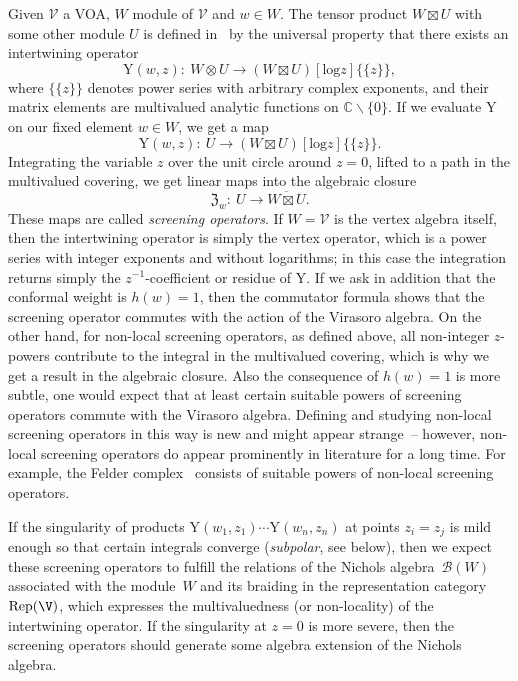 \documentclass[pdftex]{sigma}%
\numberwithin{equation}{section}
\newcommand{\C}{\mathbb{C}}
\newcommand{\Y}{\mathrm{Y}}
\newcommand{\cB}{\mathcal{B}}
\begin{document}
Given $\mathcal{V}$ a VOA, $W$ module of $\mathcal{V}$ and $w \in W$. The tensor product $W\boxtimes U$ with some other module $U$ is defined in~\cite{HLZ06} by the universal property that there exists an intertwining operator
\[\Y(w, z)\colon \ W\otimes U \rightarrow (W \boxtimes U)[\mathrm{log} z]\{\{z\}\},\]
where $\{\{z\}\}$ denotes power series with arbitrary complex exponents, and their matrix elements are multivalued analytic functions on $\C\backslash\{0\}$. If we evaluate $\Y$ on our fixed element $w\in W$, we get a map
\[\Y(w, z)\colon \ U \rightarrow (W \boxtimes U)[\mathrm{log} z]\{\{z\}\}.\]
	Integrating the variable $z$ over the unit circle around $z=0$, lifted to a path in the multivalued covering, we get linear maps into the algebraic closure
	\[\mathfrak{Z}_w \colon \  U \rightarrow \overline{W \boxtimes U}.\]
	These maps are called \emph{screening operators}. If $W=\mathcal{V}$ is the vertex algebra itself, then the intertwining operator is simply the vertex operator, which is a power series with integer exponents and without logarithms; in this case the integration returns simply the $z^{-1}$-coefficient or residue of $\Y$. If we ask in addition that the conformal weight is $h(w)=1$, then the commutator formula shows that the screening operator commutes with the action of the Virasoro algebra. On the other hand, for non-local screening operators, as defined above, all non-integer $z$-powers contribute to the integral in the multivalued covering, which is why we get a result in the algebraic closure. Also the consequence of $h(w)=1$ is more subtle, one would expect that at least certain suitable powers of screening operators commute with the Virasoro algebra. Defining and studying non-local screening operators in this way is new and might appear strange~-- however, non-local screening operators do appear prominently in literature for a long time. For example, the Felder complex~\cite{Fel89} consists of suitable powers of non-local screening operators.
	
If the singularity of products $\Y(w_1,z_1)\cdots \Y(w_n,z_n)$ at points $z_i=z_j$ is mild enough so that certain integrals converge (\emph{subpolar}, see below), then we expect these screening operators to fulfill the relations of the Nichols algebra~$\cB(W)$ associated with the module~$W$ and its braiding in the representation category $\operatorname{Rep}(\V)$, which expresses the multivaluedness (or non-locality) of the intertwining operator.
If the singularity at $z=0$ is more severe, then the screening operators should generate some algebra extension of the Nichols algebra.
\end{document}
